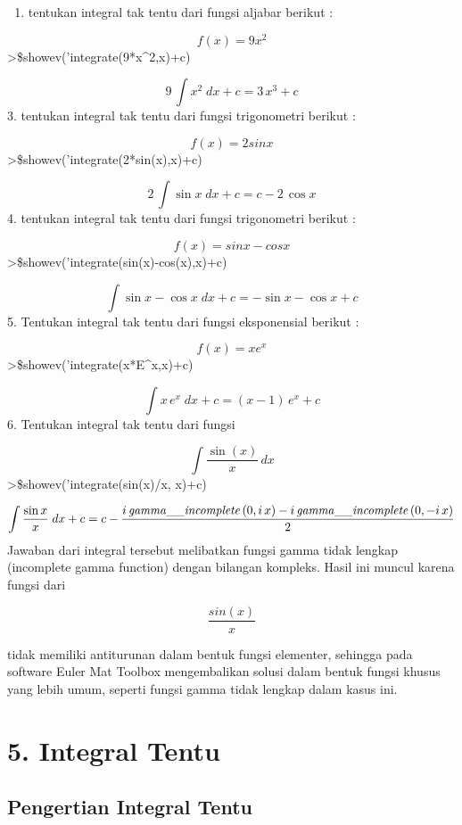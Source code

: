 \documentclass[
]{book}
\providecommand{\tightlist}{%
  \setlength{\itemsep}{0pt}\setlength{\parskip}{0pt}}
\begin{document}
\begin{enumerate}
\def\labelenumi{\arabic{enumi}.}
\setcounter{enumi}{1}
\tightlist
\item
  tentukan integral tak tentu dari fungsi aljabar berikut :
\end{enumerate}

\[f(x)=9x^2\]\textgreater\$showev('integrate(9*x\^{}2,x)+c)

\[9\,\int {x^2}{\;dx}+c=3\,x^3+c\]3. tentukan integral tak tentu dari fungsi trigonometri berikut :

\[f(x)= 2 sin x\]\textgreater\$showev('integrate(2*sin(x),x)+c)

\[2\,\int {\sin x}{\;dx}+c=c-2\,\cos x\]4. tentukan integral tak tentu dari fungsi trigonometri berikut :

\[f(x)= sin x - cos x\]\textgreater\$showev('integrate(sin(x)-cos(x),x)+c)

\[\int {\sin x-\cos x}{\;dx}+c=-\sin x-\cos x+c\]5. Tentukan integral tak tentu dari fungsi eksponensial berikut :

\[f(x)=x e^x\]\textgreater\$showev('integrate(x*E\^{}x,x)+c)

\[\int {x\,e^{x}}{\;dx}+c=\left(x-1\right)\,e^{x}+c\]6. Tentukan integral tak tentu dari fungsi

\[\int\frac{\sin(x)}{x}\,dx\]\textgreater\$showev('integrate(sin(x)/x, x)+c)

\[\int {\frac{\sin x}{x}}{\;dx}+c=c-\frac{i\,  {\it gamma\_\_incomplete}\left(0 , i\,x\right)-i\,  {\it gamma\_\_incomplete}\left(0 , -i\,x\right)}{2}\]Jawaban dari integral tersebut melibatkan fungsi gamma tidak lengkap (incomplete gamma function) dengan bilangan kompleks. Hasil ini muncul karena fungsi dari

\[\frac{sin(x)}{x}\]

tidak memiliki antiturunan dalam bentuk fungsi elementer, sehingga pada software Euler Mat Toolbox mengembalikan solusi dalam bentuk fungsi khusus yang lebih umum, seperti fungsi gamma tidak lengkap dalam kasus ini.

\chapter{5. Integral Tentu}\label{integral-tentu}

\section{Pengertian Integral Tentu}\label{pengertian-integral-tentu}
\end{document}
